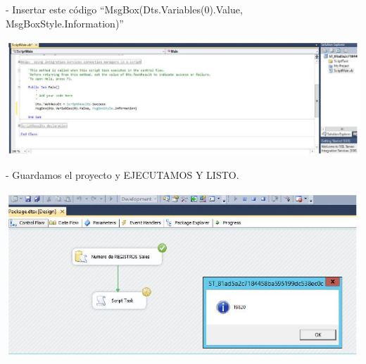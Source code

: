 \begin{itemize}
- Insertar este código “MsgBox(Dts.Variables(0).Value, MsgBoxStyle.Information)”

	\begin{center}
	\includegraphics[width=17cm]{./Imagenes/20}
	\end{center}	

- Guardamos el proyecto y EJECUTAMOS Y LISTO.

	\begin{center}
	\includegraphics[width=15cm]{./Imagenes/21}
	\end{center}	
\end{itemize}